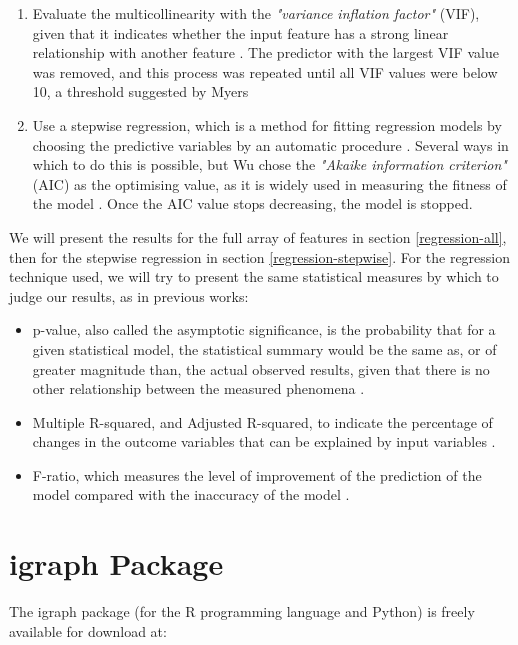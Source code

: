 \documentclass[bsc,frontabs,twoside,singlespacing,parskip,deptreport]{infthesis}
\begin{document}
\begin{enumerate}
	\item Evaluate the multicollinearity with the \textit{"variance inflation factor"} (VIF), given that it indicates whether the input feature has a strong linear relationship with another feature \cite{fox}. The predictor with the largest VIF value was removed, and this process was repeated until all VIF values were below 10, a threshold suggested by Myers \cite{myers}
	\item Use a stepwise regression, which is a method for fitting regression models by choosing the predictive variables by an automatic procedure \cite{ralston1960mathematical}. Several ways in which to do this is possible, but Wu \cite{masters} chose the \textit{"Akaike information criterion"} (AIC) as the optimising value, as it is widely used in measuring the fitness of the model \cite{akaike1998information}. Once the AIC value stops decreasing, the model is stopped.
\end{enumerate}

We will present the results for the full array of features in section \ref{regression-all}, then for the stepwise regression in section \ref{regression-stepwise}. For the regression technique used, we will try to present the same statistical measures by which to judge our results, as in previous works:

\begin{itemize}
	\item p-value, also called the asymptotic significance, is the probability that for a given statistical model, the statistical summary would be the same as, or of greater magnitude than, the actual observed results, given that there is no other relationship between the measured phenomena \cite{wasserstein2016asa}.
	\item Multiple R-squared, and Adjusted R-squared, to indicate the percentage of changes in the outcome variables that can be explained by input variables \cite{masters}.
	\item F-ratio, which measures the level of improvement of the prediction of the model compared with the inaccuracy of the model \cite{FieldAndyP2012DsuR}.
\end{itemize}

\section{igraph Package}\label{igraph}
The igraph package (for the R programming language and Python) is freely available for download at: 
\end{document}
